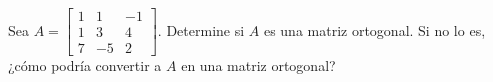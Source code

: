 \begin{exercise}
	Sea $A =\begin{bmatrix}
		1 & 1 & -1\\
		1 & 3 & 4\\
		7 & -5 & 2
	\end{bmatrix}$. Determine si $A$ es una matriz ortogonal. Si no lo es, ¿cómo podría convertir a $A$ en una matriz ortogonal?
\end{exercise}